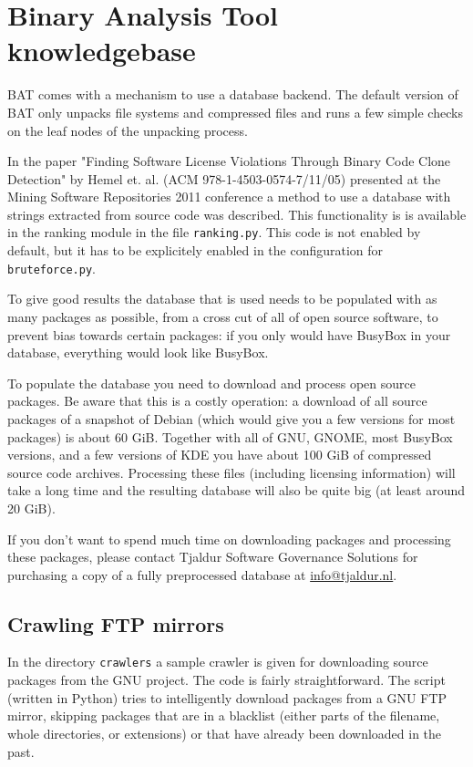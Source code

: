 \documentclass[10pt]{article}
\begin{document}
\section{Binary Analysis Tool knowledgebase}

BAT comes with a mechanism to use a database backend. The default version of
BAT only unpacks file systems and compressed files and runs a few simple checks
on the leaf nodes of the unpacking process.

In the paper "Finding Software License Violations Through Binary Code Clone
Detection" by Hemel et. al. (ACM 978-1-4503-0574-7/11/05) presented at
the Mining Software Repositories 2011 conference a method to use a database
with strings extracted from source code was described. This functionality is
is available in the ranking module in the file \texttt{ranking.py}. This code
is not enabled by default, but it has to be explicitely enabled in the
configuration for \texttt{bruteforce.py}.

To give good results the database that is used needs to be populated with as
many packages as possible, from a cross cut of all of open source software, to
prevent bias towards certain packages: if you only would have BusyBox in your
database, everything would look like BusyBox.

To populate the database you need to download and process open source packages.
Be aware that this is a costly operation: a download of all source packages of
a snapshot of Debian (which would give you a few versions for most packages) is
about 60 GiB. Together with all of GNU, GNOME, most BusyBox versions, and a few
versions of KDE you have about 100 GiB of compressed source code archives.
Processing these files (including licensing information) will take a long time
and the resulting database will also be quite big (at least around 20 GiB).

If you don't want to spend much time on downloading packages and processing
these packages, please contact Tjaldur Software Governance Solutions for
purchasing a copy of a fully preprocessed database at \url{info@tjaldur.nl}.

\subsection{Crawling FTP mirrors}

In the directory \texttt{crawlers} a sample crawler is given for downloading
source packages from the GNU project. The code is fairly straightforward. The
script (written in Python) tries to intelligently download packages from a GNU
FTP mirror, skipping packages that are in a blacklist (either parts of the
filename, whole directories, or extensions) or that have already been
downloaded in the past.
\end{document}
